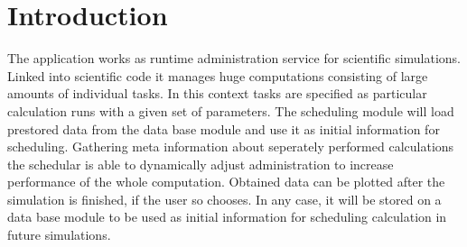 \section{Introduction}






The application works as runtime administration service for scientific simulations. Linked into scientific code it manages huge computations consisting of large amounts of individual tasks. In this context tasks are specified as particular calculation runs with a given set of parameters. The scheduling module will load prestored data from the data base module and use it as initial information for scheduling. Gathering meta information about seperately performed calculations the schedular is able to dynamically adjust administration to increase performance of the whole computation. Obtained data can be plotted after the simulation is finished, if the user so chooses. In any case, it will be stored on a data base module to be used as initial information for scheduling calculation in future simulations. 